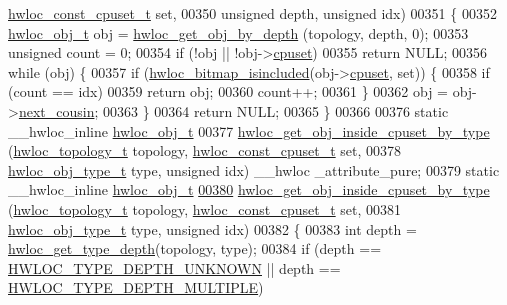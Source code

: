 \begin{DoxyCode}
      \hyperlink{a00040_ga1f784433e9b606261f62d1134f6a3b25}{hwloc_const_cpuset_t} \textcolor{keyword}{set},
00350                                       \textcolor{keywordtype}{unsigned} depth, \textcolor{keywordtype}{unsigned} idx)
00351 \{
00352   \hyperlink{a00016}{hwloc_obj_t} obj = \hyperlink{a00047_gaedd78240b0c1108355586a268ec5a697}{hwloc_get_obj_by_depth} (topology, depth, 0);
00353   \textcolor{keywordtype}{unsigned} count = 0;
00354   \textcolor{keywordflow}{if} (!obj || !obj->\hyperlink{a00016_a67925e0f2c47f50408fbdb9bddd0790f}{cpuset})
00355     \textcolor{keywordflow}{return} NULL;
00356   \textcolor{keywordflow}{while} (obj) \{
00357     \textcolor{keywordflow}{if} (\hyperlink{a00065_gaae29e14a926c198e8f91e6e4790621e7}{hwloc_bitmap_isincluded}(obj->\hyperlink{a00016_a67925e0f2c47f50408fbdb9bddd0790f}{cpuset}, \textcolor{keyword}{set})) \{
00358       \textcolor{keywordflow}{if} (count == idx)
00359         \textcolor{keywordflow}{return} obj;
00360       count++;
00361     \}
00362     obj = obj->\hyperlink{a00016_a85a788017457129589318b6c39451acf}{next_cousin};
00363   \}
00364   \textcolor{keywordflow}{return} NULL;
00365 \}
00366 
00376 \textcolor{keyword}{static} \_\_hwloc\_inline \hyperlink{a00016}{hwloc_obj_t}
00377 \hyperlink{a00054_gaa8dcdb85224f7350b90fb0a1ca91e6d6}{hwloc_get_obj_inside_cpuset_by_type} (\hyperlink{a00039_ga9d1e76ee15a7dee158b786c30b6a6e38}{hwloc_topology_t} topology, 
      \hyperlink{a00040_ga1f784433e9b606261f62d1134f6a3b25}{hwloc_const_cpuset_t} \textcolor{keyword}{set},
00378                                      \hyperlink{a00041_gacd37bb612667dc437d66bfb175a8dc55}{hwloc_obj_type_t} type, \textcolor{keywordtype}{unsigned} idx) \_\_hwloc
      \_attribute\_pure;
00379 \textcolor{keyword}{static} \_\_hwloc\_inline \hyperlink{a00016}{hwloc_obj_t}
\hypertarget{a00031_source_l00380}{}\hyperlink{a00054_gaa8dcdb85224f7350b90fb0a1ca91e6d6}{00380} \hyperlink{a00054_gaa8dcdb85224f7350b90fb0a1ca91e6d6}{hwloc_get_obj_inside_cpuset_by_type} (\hyperlink{a00039_ga9d1e76ee15a7dee158b786c30b6a6e38}{hwloc_topology_t} topology, 
      \hyperlink{a00040_ga1f784433e9b606261f62d1134f6a3b25}{hwloc_const_cpuset_t} \textcolor{keyword}{set},
00381                                      \hyperlink{a00041_gacd37bb612667dc437d66bfb175a8dc55}{hwloc_obj_type_t} type, \textcolor{keywordtype}{unsigned} idx)
00382 \{
00383   \textcolor{keywordtype}{int} depth = \hyperlink{a00046_gaea7c64dd59467f5201ba87712710b14d}{hwloc_get_type_depth}(topology, type);
00384   \textcolor{keywordflow}{if} (depth == \hyperlink{a00046_ggaf4e663cf42bbe20756b849c6293ef575a0565ab92ab72cb0cec91e23003294aad}{HWLOC_TYPE_DEPTH_UNKNOWN} || depth == \hyperlink{a00046_ggaf4e663cf42bbe20756b849c6293ef575ae99465995cacde6c210d5fc2e409798c}{HWLOC_TYPE_DEPTH_MULTIPLE})

\end{DoxyCode}

